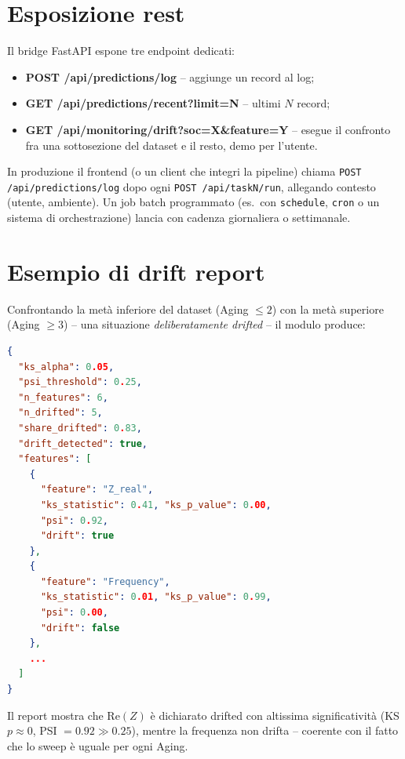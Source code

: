 \section{Esposizione \texorpdfstring{\acrshort{rest}}{REST}}

Il bridge FastAPI espone tre endpoint dedicati:
\begin{itemize}
  \item \textbf{POST /api/predictions/log} -- aggiunge un record al log;
  \item \textbf{GET /api/predictions/recent?limit=N} -- ultimi $N$
        record;
  \item \textbf{GET /api/monitoring/drift?soc=X\&feature=Y} -- esegue il
        confronto fra una sottosezione del dataset e il resto, demo per
        l'utente.
\end{itemize}

In produzione il frontend (o un client che integri la pipeline) chiama
\texttt{POST /api/predictions/log} dopo ogni \texttt{POST /api/taskN/run},
allegando contesto (utente, ambiente). Un job batch programmato (es.~con
\texttt{schedule}, \texttt{cron} o un sistema di orchestrazione) lancia
 con cadenza giornaliera o settimanale.

\section{Esempio di drift report}

Confrontando la metà inferiore del dataset (Aging $\leq 2$) con la metà
superiore (Aging $\geq 3$) -- una situazione \emph{deliberatamente
drifted} -- il modulo produce:

\begin{lstlisting}[language=JSON]
{
  "ks_alpha": 0.05,
  "psi_threshold": 0.25,
  "n_features": 6,
  "n_drifted": 5,
  "share_drifted": 0.83,
  "drift_detected": true,
  "features": [
    {
      "feature": "Z_real",
      "ks_statistic": 0.41, "ks_p_value": 0.00,
      "psi": 0.92,
      "drift": true
    },
    {
      "feature": "Frequency",
      "ks_statistic": 0.01, "ks_p_value": 0.99,
      "psi": 0.00,
      "drift": false
    },
    ...
  ]
}
\end{lstlisting}

Il report mostra che $\mathrm{Re}(Z)$ è dichiarato drifted con altissima
significatività (KS $p \approx 0$, PSI $= 0.92 \gg 0.25$), mentre la
frequenza non drifta -- coerente con il fatto che lo sweep è uguale per
ogni Aging.

